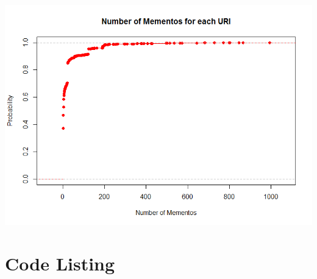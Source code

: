 	\begin{minipage}{\linewidth}
		\centering
			\includegraphics[scale=0.55]{figures/q2/numberMementos}
		\label{wordCount}
	\end{minipage}
	

\newpage
\section{Code Listing}

\newpage


\newpage
